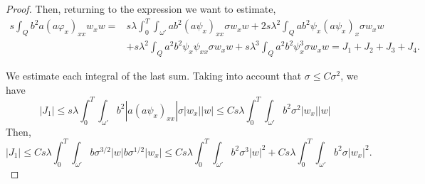 \documentclass[11pt,oneside,a4papper]{osajnl}
\begin{document}
\begin{proof}
	Then, returning to the expression we want to estimate, 
	\begin{align*}
		s\int_Q b^2 a (a \varphi_x)_{xx} w_x w=&s\lambda\int_0^T\int_{\omega'} ab^2 (a\psi_x)_{xx} \sigma w_x w +2s\lambda^2 \int_Q ab^2 \psi_x (a\psi_x)_x \sigma w_x w\\
		&+s\lambda^2\int_Q a^2b^2\psi_x\psi_{xx} \sigma w_x w
		+s\lambda^3\int_Q a^2b^2\psi_x^3 \sigma w_x w
		=J_1+J_2+J_3+J_4.
	\end{align*}
    
    We estimate each integral of the last sum. Taking into account that $\sigma\leq C\sigma^2$, we have
    $$\left|J_1 \right|\leq s\lambda\int_0^T\int_{\omega'} b^2 |a(a\psi_x)_{xx}| \sigma |w_x| |w|\leq Cs\lambda\int_0^T\int_{\omega'} b^2  \sigma^2 |w_x| |w|$$
    Then,
    $$
    \left|J_1 \right|\leq Cs\lambda\int_0^T\int_{\omega'} b \sigma^{3/2}|w| b\sigma^{1/2} |w_x| \leq Cs\lambda\int_0^T\int_{\omega'}b^2 \sigma^3|w|^2 + Cs\lambda\int_0^T\int_{\omega'}b^2 \sigma|w_x|^2.
    $$
	

\end{proof}
\end{document}
